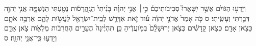 \documentclass{openreader}
\begin{document}
וְיָדְע֣וּ הַגֹּויִ֗ם אֲשֶׁ֣ר יִֽשָּׁאֲרוּ֮ סְבִיבֹותֵיכֶם֒ כִּ֣י׀ אֲנִ֣י יְהוָ֗ה בָּנִ֨יתִי֙ הַנֶּ֣הֱרָסֹ֔ות נָטַ֖עְתִּי הַנְּשַׁמָּ֑ה אֲנִ֥י יְהוָ֖ה דִּבַּ֥רְתִּי וְעָשִֽׂיתִי׃ ס 
כֹּ֤ה אָמַר֙ אֲדֹנָ֣י יְהוִ֔ה עֹ֗וד זֹ֛את אִדָּרֵ֥שׁ לְבֵֽית־יִשְׂרָאֵ֖ל לַעֲשֹׂ֣ות לָהֶ֑ם אַרְבֶּ֥ה אֹתָ֛ם כַּצֹּ֖אן אָדָֽם׃ 
כְּצֹ֣אן קָֽדָשִׁ֗ים כְּצֹ֤אן יְרוּשָׁלִַ֨ם֙ בְּמֹ֣ועֲדֶ֔יהָ כֵּ֤ן תִּהְיֶ֨ינָה֙ הֶעָרִ֣ים הֶחֳרֵבֹ֔ות מְלֵאֹ֖ות צֹ֣אן אָדָ֑ם וְיָדְע֖וּ כִּֽי־אֲנִ֥י יְהוָֽה׃ ס 
\end{document}
